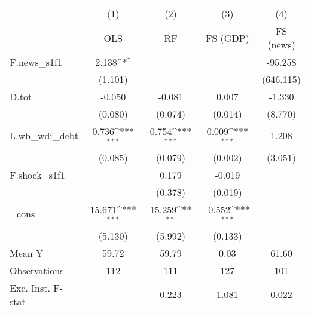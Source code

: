 {
\def\sym#1{\ifmmode^{#1}\else\(^{#1}\)\fi}
\begin{tabular}{l*{4}{c}}
\toprule
            &\multicolumn{1}{c}{(1)}&\multicolumn{1}{c}{(2)}&\multicolumn{1}{c}{(3)}&\multicolumn{1}{c}{(4)}\\
            &\multicolumn{1}{c}{OLS}&\multicolumn{1}{c}{RF}&\multicolumn{1}{c}{FS (GDP)}&\multicolumn{1}{c}{FS (news)}\\
\midrule
F.news\_s1f1 &       2.138\sym{*}  &                     &                     &     -95.258         \\
            &     (1.101)         &                     &                     &   (646.115)         \\
\addlinespace
D.tot       &      -0.050         &      -0.081         &       0.007         &      -1.330         \\
            &     (0.080)         &     (0.074)         &     (0.014)         &     (8.770)         \\
\addlinespace
L.wb\_wdi\_debt&       0.736\sym{***}&       0.754\sym{***}&       0.009\sym{***}&       1.208         \\
            &     (0.085)         &     (0.079)         &     (0.002)         &     (3.051)         \\
\addlinespace
F.shock\_s1f1&                     &       0.179         &      -0.019         &                     \\
            &                     &     (0.378)         &     (0.019)         &                     \\
\addlinespace
\_cons      &      15.671\sym{***}&      15.259\sym{**} &      -0.552\sym{***}&                     \\
            &     (5.130)         &     (5.992)         &     (0.133)         &                     \\
\midrule
Mean Y      &       59.72         &       59.79         &        0.03         &       61.60         \\
Observations&         112         &         111         &         127         &         101         \\
Exc. Inst. F-stat&                     &       0.223         &       1.081         &       0.022         \\
\bottomrule
\end{tabular}
}
